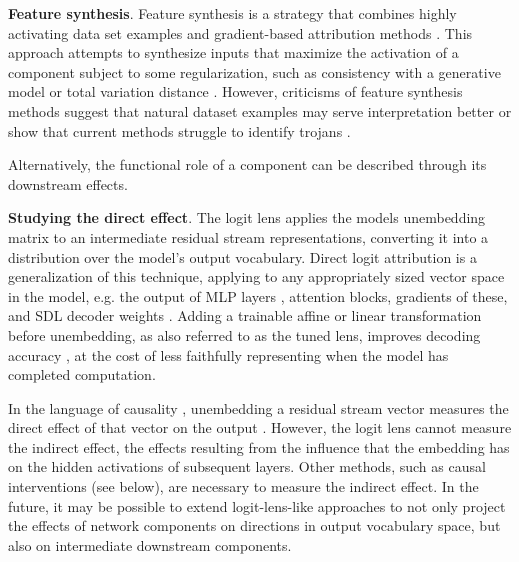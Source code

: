 \textbf{Feature synthesis}. Feature synthesis is a strategy that combines highly activating data set examples and gradient-based attribution methods 
\citep{Erhan_2009_visualising, szegedy2014intriguingpropertiesneuralnetworks,Olah__2017_FeatureVisualisation}. This approach attempts to synthesize inputs that maximize the activation of a component subject to some regularization, such as consistency with a generative model \citep{nguyen2016synthesizingpreferredinputsneurons, nguyen2017plugplaygenerative} or total variation distance \citep{mahendran2014understandingdeepimagerepresentations}. However, criticisms of feature synthesis methods suggest that natural dataset examples may serve interpretation better \citep{zimmermann2021how, borowski2021exemplarynaturalimagesexplain} or show that current methods struggle to identify trojans \citep{casper2023redteamingdeepneural}.

\label{par:downstream-effects}

Alternatively, the functional role of a component can be described through its downstream effects.

\textbf{Studying the direct effect}. The logit lens \citep{Nostalgebraist_2020} applies the models unembedding matrix to an intermediate residual stream representations, converting it into a distribution over the model's output vocabulary. Direct logit attribution is a generalization of this technique, applying to any appropriately sized vector space in the model, e.g. the output of MLP layers \citep{geva2021transformerfeedforwardlayerskeyvalue,geva2022transformerfeedforwardlayersbuild,geva2022lmdebuggerinteractivetoolinspection,dar-etal-2023-analyzing}, attention blocks, gradients \citep{katz2024backwardlensprojectinglanguage} of these, and SDL decoder weights \citep{Bricken_2023_dictionary}. Adding a trainable affine or linear transformation before unembedding, as also referred to as the tuned lens, improves decoding accuracy \citep{belrose2023elicitinglatentpredictionstransformers,yom-din-etal-2024-jump}, at the cost of less faithfully representing when the model has completed computation.

In the language of causality \citep{Pearl_2009}, unembedding a residual stream vector measures the direct effect of that vector on the output \citep{mcgrath2023hydraeffectemergentselfrepair}. However, the logit lens cannot measure the indirect effect, the effects resulting from the influence that the embedding has on the hidden activations of subsequent layers. Other methods, such as causal interventions (see below), are necessary to measure the indirect effect. In the future, it may be possible to extend logit-lens-like approaches to not only project the effects of network components on directions in output vocabulary space, but also on intermediate downstream components.

